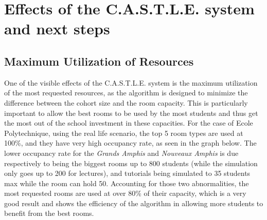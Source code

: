 \documentclass[a4paper, oneside]{article}
\theoremstyle{plain}
\newcommand{\castle}{C{\small.}A{\small.}S{\small.}T{\small.}L{\small.}E{\small.}}
\begin{document}
\section{Effects of the \castle{} system and next steps}

\subsection{Maximum Utilization of Resources}

One of the visible effects of the \castle{} system is the maximum utilization of the most requested resources, as the algorithm is designed to minimize the difference between the cohort size and the room capacity.
This is particularly important to allow the best rooms to be used by the most students and thus get the most out of the school investment in these capacities. For the case of Ecole Polytechnique, using the
real life scenario, the top 5 room types are used at 100\%, and they have very high occupancy rate, as seen in the graph below. The lower occupancy rate for the \textit{Grands Amphis} and \textit{Nouveaux Amphis}
is due respectively to being the biggest rooms up to 800 students (while the simulation only goes up to 200 for lectures), and tutorials being simulated to 35 students max while the room can hold 50. Accounting for
those two abnormalities, the most requested rooms are used at over 80\% of their capacity, which is a very good result and shows the efficiency of the algorithm in allowing more students to benefit from the best rooms.
\end{document}
